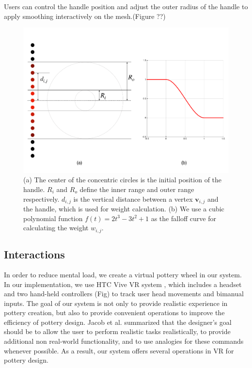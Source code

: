 \documentclass{svjour3}                     %
\begin{document}
Users can control the handle position and adjust the outer radius of the handle to apply smoothing interactively on the mesh.(Figure ??)

\begin{figure}
  \includegraphics[width=\textwidth]{fig6.pdf}
\caption{(a) The center of the concentric circles is the initial position of the handle. $R_{i}$ and $R_{o}$ define the inner range and outer range respectively. $d_{i,j}$ is the vertical distance between a vertex $\mathbf{v}_{i,j}$ and the handle, which is used for weight calculation. (b) We use a cubic polynomial function $f(t) = 2t^3 - 3t^2 + 1$ as the falloff curve for calculating the weight $w_{i,j}$. }
\label{fig:6}       %
\end{figure}

\subsection{Interactions}
\label{sec:4.3}

In order to reduce mental load, we create a virtual pottery wheel in our system.
In our implementation, we use HTC Vive VR system \cite{website:vive}, which includes a headset and two hand-held controllers (Fig) to track user head movements and bimanual inputs.
The goal of our system is not only to provide realistic experience in pottery creation, but also to provide convenient operations to improve the efficiency of pottery design. 
Jacob et al. \cite{Jacob2008Reality} summarized that the designer's goal should be to allow the user to perform realistic tasks realistically, to provide additional non real-world functionality, and to use analogies for these commands whenever possible.
As a result, our system offers several operations in VR for pottery design.
\end{document}
